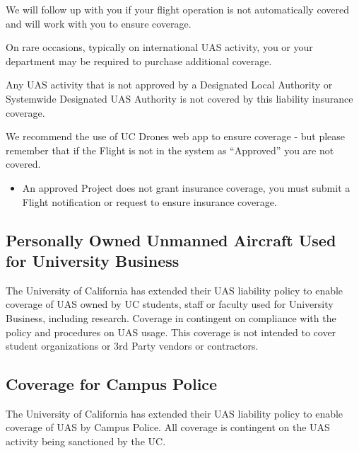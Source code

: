 \documentclass[
  12pt,
]{book}
\providecommand{\tightlist}{%
  \setlength{\itemsep}{0pt}\setlength{\parskip}{0pt}}
\newenvironment{notebox}{
  \definecolor{shadecolor}{gray}{.8}  %
  \color{black}
  \begin{shaded}}
 {\end{shaded}}
\begin{document}
\begin{notebox}
We will follow up with you if your flight operation is not automatically covered and will work with you to ensure coverage.

On rare occasions, typically on international UAS activity, you or your department may be required to purchase additional coverage.

\end{notebox}

Any UAS activity that is not approved by a Designated Local Authority or Systemwide Designated UAS Authority is not covered by this liability insurance coverage.

We recommend the use of UC Drones web app to ensure coverage - but please remember that if the Flight is not in the system as ``Approved'' you are not covered.

\begin{itemize}
\tightlist
\item
  An approved Project does not grant insurance coverage, you must submit a Flight notification or request to ensure insurance coverage.
\end{itemize}

\hypertarget{personally-owned-unmanned-aircraft-used-for-university-business}{%
\subsection{Personally Owned Unmanned Aircraft Used for University Business}\label{personally-owned-unmanned-aircraft-used-for-university-business}}

The University of California has extended their UAS liability policy to enable coverage of UAS owned by UC students, staff or faculty used for University Business, including research. Coverage in contingent on compliance with the policy and procedures on UAS usage. This coverage is not intended to cover student organizations or 3rd Party vendors or contractors.

\hypertarget{coverage-for-campus-police}{%
\subsection{Coverage for Campus Police}\label{coverage-for-campus-police}}

The University of California has extended their UAS liability policy to enable coverage of UAS by Campus Police. All coverage is contingent on the UAS activity being sanctioned by the UC.
\end{document}
